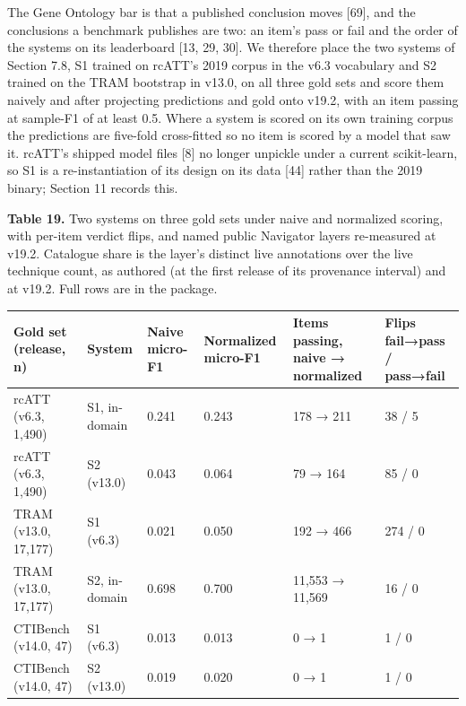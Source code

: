 \documentclass[11pt,a4paper]{article}
\begin{document}
The Gene Ontology bar is that a published conclusion moves [69], and the conclusions a benchmark publishes are two: an item's pass or fail and the order of the systems on its leaderboard [13, 29, 30]. We therefore place the two systems of Section 7.8, S1 trained on rcATT's 2019 corpus in the v6.3 vocabulary and S2 trained on the TRAM bootstrap in v13.0, on all three gold sets and score them naively and after projecting predictions and gold onto v19.2, with an item passing at sample-F1 of at least 0.5. Where a system is scored on its own training corpus the predictions are five-fold cross-fitted so no item is scored by a model that saw it. rcATT's shipped model files [8] no longer unpickle under a current scikit-learn, so S1 is a re-instantiation of its design on its data [44] rather than the 2019 binary; Section 11 records this.

\textbf{Table 19.} Two systems on three gold sets under naive and normalized scoring, with per-item verdict flips, and named public Navigator layers re-measured at v19.2. Catalogue share is the layer's distinct live annotations over the live technique count, as authored (at the first release of its provenance interval) and at v19.2. Full rows are in the package.

\begin{center}\footnotesize
\begin{tabular}{llllll}
\toprule
Gold set (release, n) & System & Naive micro-F1 & Normalized micro-F1 & Items passing, naive → normalized & Flips fail→pass / pass→fail \\
\midrule
rcATT (v6.3, 1,490) & S1, in-domain & 0.241 & 0.243 & 178 → 211 & 38 / 5 \\
rcATT (v6.3, 1,490) & S2 (v13.0) & 0.043 & 0.064 & 79 → 164 & 85 / 0 \\
TRAM (v13.0, 17,177) & S1 (v6.3) & 0.021 & 0.050 & 192 → 466 & 274 / 0 \\
TRAM (v13.0, 17,177) & S2, in-domain & 0.698 & 0.700 & 11,553 → 11,569 & 16 / 0 \\
CTIBench (v14.0, 47) & S1 (v6.3) & 0.013 & 0.013 & 0 → 1 & 1 / 0 \\
CTIBench (v14.0, 47) & S2 (v13.0) & 0.019 & 0.020 & 0 → 1 & 1 / 0 \\
\bottomrule
\end{tabular}
\end{center}
\end{document}
